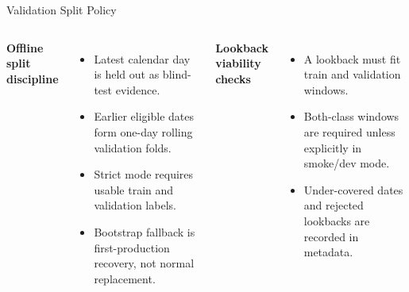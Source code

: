 \documentclass[aspectratio=169]{beamer}
\begin{document}
\begin{frame}[shrink=4]{Validation Split Policy}
\begin{columns}[T,onlytextwidth]
\textbf{Offline split discipline}
\begin{itemize}
  \item Latest calendar day is held out as blind-test evidence.
  \item Earlier eligible dates form one-day rolling validation folds.
  \item Strict mode requires usable train and validation labels.
  \item Bootstrap fallback is first-production recovery, not normal replacement.
\end{itemize}

\textbf{Lookback viability checks}
\begin{itemize}
  \item A lookback must fit train and validation windows.
  \item Both-class windows are required unless explicitly in smoke/dev mode.
  \item Under-covered dates and rejected lookbacks are recorded in metadata.
\end{itemize}
\end{columns}
\tightsep
\begin{center}
\hspace{0.45em}
\hspace{0.45em}
\hspace{0.45em}
\end{center}
\end{frame}
\end{document}
